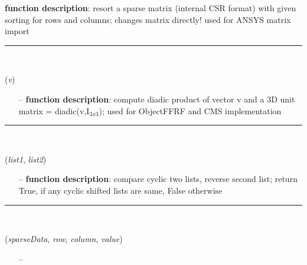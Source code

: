 \begin{itemize}[leftmargin=1.4cm]
\begin{itemize}[leftmargin=1.4cm]
\begin{itemize}[leftmargin=0.5cm]
\begin{itemize}[leftmargin=1.4cm]
\begin{itemize}[leftmargin=1.4cm]
\begin{itemize}[leftmargin=0.5cm]
\begin{itemize}[leftmargin=0.7cm]
{\bf function description}: resort a sparse matrix (internal CSR format) with given sorting for rows and columns; changes matrix directly! used for ANSYS matrix import
\vspace{12pt}\end{itemize}
%
\noindent\rule{8cm}{0.75pt}\vspace{1pt} \\ 
\begin{flushleft}
\label{sec:FEM:VectorDiadicUnitMatrix3D}
({\it v})
\end{flushleft}
\setlength{\itemindent}{0.7cm}
\begin{itemize}[leftmargin=0.7cm]
\item[--]
{\bf function description}: compute diadic product of vector v and a 3D unit matrix = diadic(v,I$_{3x3}$); used for ObjectFFRF and CMS implementation
\vspace{12pt}\end{itemize}
%
\noindent\rule{8cm}{0.75pt}\vspace{1pt} \\ 
\begin{flushleft}
\label{sec:FEM:CyclicCompareReversed}
({\it list1}, {\it list2})
\end{flushleft}
\setlength{\itemindent}{0.7cm}
\begin{itemize}[leftmargin=0.7cm]
\item[--]
{\bf function description}: compare cyclic two lists, reverse second list; return True, if any cyclic shifted lists are same, False otherwise
\vspace{12pt}\end{itemize}
%
\noindent\rule{8cm}{0.75pt}\vspace{1pt} \\ 
\begin{flushleft}
\label{sec:FEM:AddEntryToCompressedRowSparseArray}
({\it sparseData}, {\it row}, {\it column}, {\it value})
\end{flushleft}
\setlength{\itemindent}{0.7cm}
\begin{itemize}[leftmargin=0.7cm]
\item[--]

\end{itemize}
\end{itemize}
\end{itemize}
\end{itemize}
\end{itemize}
\end{itemize}
\end{itemize}
